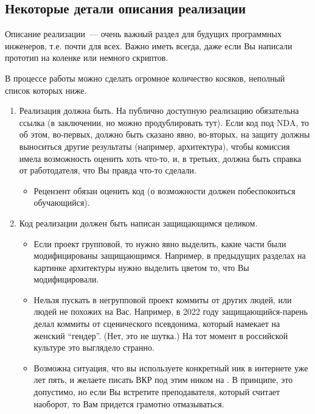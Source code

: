 \subsection{Некоторые детали описания реализации}
Описание реализации~--- очень важный раздел для будущих программных инженеров, т.е. почти для всех.
Важно иметь всегда, даже если Вы написали прототип на коленке или немного скриптов.

В процессе работы можно сделать огромное количество косяков, неполный список которых ниже.

\begin{enumerate}
    \item Реализация должна быть.
          На публично доступную реализацию обязательна ссылка (в заключении, но можно продублировать тут).
          Если код под \textsc{NDA}, то об этом, во-первых, должно быть сказано явно,
          во-вторых, на защиту должны выно\-ситься другие результаты (например, архитектура), чтобы комис\-сия имела возможность оценить хоть что-то,
          и, в третьих, должна быть справка от работодателя, что Вы правда что-то сделали.
          \begin{itemize}
              \item Рецензент обязан оценить код (о возможности должен побеспо\-коиться обучающийся).
          \end{itemize}
    \item Код реализации должен быть написан защищающимся целиком.
          \begin{itemize}
              \item Если проект групповой, то нужно явно выделить, какие части были модифицированы защищающимся.
                    Например, в преды\-дущих разделах на картинке архитектуры нужно выделить цветом то, что Вы модифицировали.
              \item Нельзя пускать в негрупповой проект коммиты от других людей, или людей не похожих на Вас.
                    Например, в 2022 году защищающийся-парень делал коммиты от сценического псев\-донима, который намекает на женский \enquote{гендер}.
                    (Нет, это не шутка.)
                    На тот момент в российской культуре это выглядело странно.
              \item Возможна ситуация, что вы используете конкретный ник в интернете уже лет пять, и желаете писать ВКР под этим ником на \GitHub{}.
                    В принципе, это допустимо, но если Вы встретите преподавателя, который считает наоборот, то Вам придется грамотно отмазы\-ваться.

\end{itemize}
\end{enumerate}
